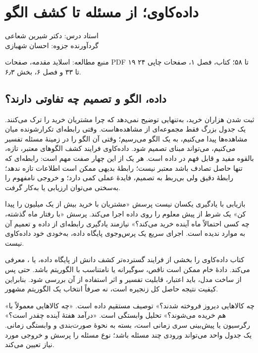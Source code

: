 \documentclass[12pt,a4paper,oneside]{report}
\newcounter{ex}[chapter]
\newenvironment{example}[1]{\refstepcounter{ex}\begin{tcolorbox}[breakable=false,title={مثال \thechapter.\arabic{ex} | #1},colframe=muted,colback=white]}{\end{tcolorbox}}
\newcommand{\source}[1]{\par{\small\color{muted} منبع مطالعه: #1}\par}
\begin{document}
\setcounter{chapter}{0}
\chapter{داده‌کاوی؛ از مسئله تا کشف الگو}
\begin{center}{\small\color{muted} استاد درس: دکتر شیرین شعاعی\\[2mm] گردآورنده جزوه: احسان شهبازی}\end{center}

\source{اسلاید مقدمه، صفحات PDF ۱۹ تا ۵۸؛ کتاب، فصل ۱، صفحات چاپی ۲۴ تا ۳۳ و فصل ۶، بخش ۶٫۳.}

\section{داده، الگو و تصمیم چه تفاوتی دارند؟}
ثبت شدن هزاران خرید، به‌تنهایی توضیح نمی‌دهد که چرا مشتریان خرید را ترک می‌کنند. یک جدول بزرگ فقط مجموعه‌ای از مشاهده‌هاست. وقتی رابطه‌ای تکرارشونده میان مشاهده‌ها پیدا می‌کنیم، به یک الگو می‌رسیم؛ وقتی آن الگو را در زمینهٔ مسئله تفسیر می‌کنیم، می‌تواند مبنای تصمیم شود. داده‌کاوی  فرایند کشف الگوهای معتبر، تازه، بالقوه مفید و قابل فهم در داده است. هر یک از این چهار صفت مهم است: رابطه‌ای که تنها حاصل تصادف باشد معتبر نیست؛ رابطهٔ بدیهی ممکن است اطلاعات تازه ندهد؛ رابطهٔ دقیق ولی بی‌ربط به تصمیم، فایدهٔ عملی کمی دارد؛ و خروجی نامفهوم را به‌سختی می‌توان ارزیابی یا به‌کار گرفت.

\begin{definition}{بازیابی با یادگیری یکسان نیست}
پرسش «مشتریان با خرید بیش از یک میلیون را پیدا کن» یک شرط از پیش معلوم را روی داده اجرا می‌کند. پرسش «با رفتار ماه گذشته، چه کسی احتمالاً ماه آینده خرید می‌کند؟» نیازمند یادگیری رابطه‌ای از داده و تعمیم آن به موارد ندیده است. اجرای سریع یک پرس‌وجوی پایگاه داده، به‌خودی خود داده‌کاوی نیست.
\end{definition}

کتاب داده‌کاوی را بخشی از فرایند گسترده‌تر کشف دانش از پایگاه داده، یا ، معرفی می‌کند. دادهٔ خام ممکن است ناقص، سوگیرانه یا نامتناسب با الگوریتم باشد. حتی پس از ساخت مدل، باید اعتبار، قابلیت تفسیر و اثر استفاده از آن بررسی شود. بنابراین کیفیت نتیجه حاصل کل زنجیره است، نه صرفاً انتخاب یک الگوریتم مشهور.

\begin{example}{سه پرسش دربارهٔ یک فروشگاه}
«چه کالاهایی دیروز فروخته شدند؟» توصیف مستقیم داده است. «چه کالاهایی معمولاً با هم خریده می‌شوند؟» تحلیل وابستگی است. «درآمد هفتهٔ آینده چقدر است؟» رگرسیون یا پیش‌بینی سری زمانی است، بسته به نحوهٔ صورت‌بندی و وابستگی زمانی. یک جدول واحد می‌تواند ورودی چند مسئله باشد؛ نوع مسئله را پرسش و خروجی مورد نیاز تعیین می‌کند.
\end{example}
\end{document}
